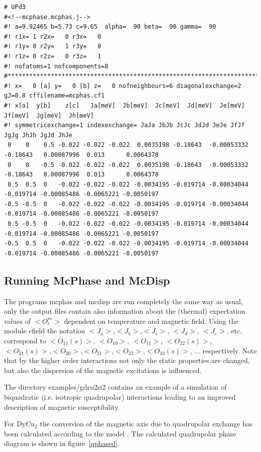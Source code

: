 {\footnotesize \begin{verbatim}
# UPd3 
#<!--mcphase.mcphas.j-->
#! a=9.92465 b=5.73 c=9.65  alpha=  90 beta=  90 gamma=  90
#! r1x= 1 r2x=   0 r3x=   0
#! r1y= 0 r2y=   1 r3y=   0
#! r1z= 0 r2z=   0 r3z=   1
#! nofatoms=1 nofcomponents=8
#*************************************************************************
#! x=   0 [a] y=   0 [b] z=   0 nofneighbours=6 diagonalexchange=2 gJ=0.8 cffilename=mcphas.cf1
#! x[a]  y[b]    z[c]   Ja[meV]  Jb[meV]  Jc[meV]  Jd[meV]  Je[meV]  Jf[meV]  Jg[meV]  Jh[meV]
#! symmetricexchange=1 indexexchange= JaJa JbJb JcJc JdJd JeJe JfJf JgJg JhJh JgJd JhJe
 0    0    0.5 -0.022 -0.022 -0.022  0.0035198 -0.18643  -0.00053332 -0.18643   0.00087996  0.013      0.0064378
 0    0   -0.5 -0.022 -0.022 -0.022  0.0035198 -0.18643  -0.00053332 -0.18643   0.00087996  0.013      0.0064378
 0.5  0.5  0   -0.022 -0.022 -0.022 -0.0034195 -0.019714 -0.00034044 -0.019714 -0.00085486 -0.0065221 -0.0050197
-0.5 -0.5  0   -0.022 -0.022 -0.022 -0.0034195 -0.019714 -0.00034044 -0.019714 -0.00085486 -0.0065221 -0.0050197
 0.5 -0.5  0   -0.022 -0.022 -0.022 -0.0034195 -0.019714 -0.00034044 -0.019714 -0.00085486 -0.0065221 -0.0050197
-0.5  0.5  0   -0.022 -0.022 -0.022 -0.0034195 -0.019714 -0.00034044 -0.019714 -0.00085486 -0.0065221 -0.0050197
\end{verbatim} }

\subsection{Running {\prg McPhase} and {\prg McDisp}}

The programs {\prg mcphas} and {\prg mcdisp} are run completely the same way as usual, only
the output files contain also information about the (thermal) expectation values of $<O_l^m>$
dependent on temperature and magnetic field. 
Using the module cfield the notation $<J_a>$,$<J_b>$,$<J_c>$,
$<J_d>$, $<J_e>$, etc. correspond to $<O_{11}(s)>$, $<O_{10}>$,
$<O_{11}>$, $<O_{22}(s)>$, $<O_{21}(s)>$,$<O_{20}>$,$<O_{21}>$,$<O_{22}>$,$<O_{33}(s)>$, ...
 respectively.
Note that by the higher order interactions not only the static properties are changed, but also the
dispersion of the magnetic excitations is influenced.


The directory {\prg examples/gdru2si2} contains an example of a simulation of biquadratic (i.e. isotropic %
quadrupolar) interactions leading to an improved description of magnetic susceptibility.

For DyCu$_2$ the conversion
of the magnetic axis due to quadrupolar exchange has been calculated according to the model 
\cite{yoshida98-1421}. The calculated quadrupolar phase diagram is shown in figure~\ref{qphased}.


